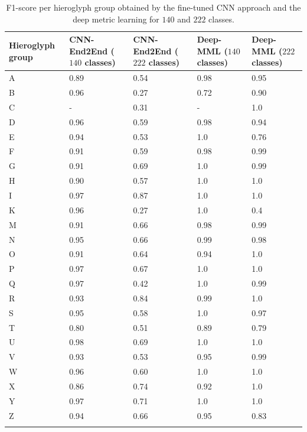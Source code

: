 \documentclass[10pt,onecolumn,letterpaper]{article}
\begin{document}
\begin{longtable}[c]{|m{2cm}|m{2.7cm}|m{2.7cm}|m{2cm}|m{2cm}|}
	\caption{F1-score per hieroglyph group obtained by the fine-tuned CNN approach and the deep metric learning for $140$ and $222$ classes.} \\
	\hline
	Hieroglyph group & CNN-End2End ($140$ classes) & CNN-End2End ($222$ classes) & Deep-MML ($140$ classes) & Deep-MML ($222$ classes) \\ \hline
	\endfirsthead
	
	A & 0.89 & 0.54 & 0.98 & 0.95 \\ \hline
	B & 0.96 & 0.27 & 0.72   & 0.90 \\ \hline
	C & - & 0.31 & -   &   1.0 \\ \hline
	D & 0.96 & 0.59 & 0.98   &   0.94 \\ \hline
	E & 0.94 & 0.53 & 1.0   &   0.76 \\ \hline
	F & 0.91 & 0.59 & 0.98    & 0.99 \\ \hline
	G & 0.91 & 0.69 & 1.0   & 0.99 \\ \hline
	H & 0.90 & 0.57 & 1.0   &   1.0 \\ \hline
	I & 0.97 & 0.87 & 1.0   &   1.0 \\ \hline
	K & 0.96 & 0.27 & 1.0   &   0.4 \\ \hline
	M & 0.91 & 0.66 & 0.98    & 0.99 \\ \hline
	N & 0.95 & 0.66 & 0.99   & 0.98 \\ \hline
	O & 0.91 & 0.64 & 0.94   & 1.0 \\ \hline
	P & 0.97 & 0.67 & 1.0   &   1.0 \\ \hline
	Q & 0.97 & 0.42 & 1.0   & 0.99 \\ \hline
	R & 0.93 & 0.84 & 0.99    & 1.0 \\ \hline
	S & 0.95 & 0.58 & 1.0    & 0.97 \\ \hline
	T & 0.80 & 0.51 & 0.89    & 0.79 \\ \hline
	U & 0.98 & 0.69 & 1.0    &  1.0 \\ \hline
	V & 0.93 & 0.53 & 0.95   & 0.99 \\ \hline
	W & 0.96 & 0.60 & 1.0    &  1.0 \\ \hline
	X & 0.86 & 0.74 & 0.92 & 1.0 \\ \hline
	Y & 0.97 & 0.71 & 1.0 & 1.0 \\ \hline
	Z & 0.94 & 0.66 & 0.95   &   0.83 \\ \hline
\label{tab2}
\end{longtable}
\end{document}
